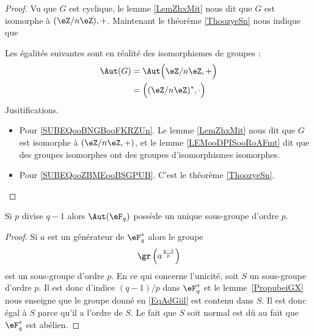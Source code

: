 \begin{proof}
	Vu que \( G\) est cyclique, le lemme \ref{LemZhxMit} nous dit que \( G\) est isomorphe à \( (\eZ/n\eZ),+\). Maintenant le théorème \ref{ThoozyeSn} nous indique que

	Les égalités suivantes sont en réalité des isomorphismes de groupes :
	\begin{subequations}
		\begin{align}
			\Aut(G) & =\Aut\Big( \eZ/n\eZ,+ \Big)  \label{SUBEQooBNGBooFKRZUn}       \\
			        & =\Big( (\eZ/n\eZ)^*,\cdot \Big)    \label{SUBEQooZBMEooBSGPUB}
		\end{align}
	\end{subequations}
	Jusitifications.
	\begin{itemize}
		\item
		      Pour \eqref{SUBEQooBNGBooFKRZUn}. Le lemme \ref{LemZhxMit} nous dit que \( G\) est isomorphe à \( (\eZ/n\eZ, +)\), et le lemme \ref{LEMooDPISooRoAFmt} dit que des groupes isomorphes ont des groupes d'isomorphismes isomorphes.

		\item
		      Pour \eqref{SUBEQooZBMEooBSGPUB}. C'est le théorème \ref{ThoozyeSn}.
	\end{itemize}
\end{proof}

\begin{corollary}       \label{CorwgmoTK}
	Si \( p\) divise \( q-1\) alors \( \Aut(\eF_q)\) possède un unique sous-groupe d'ordre \( p\).
\end{corollary}

\begin{proof}
	Si \( a\) est un générateur de \( \eF_q^*\) alors le groupe
	\begin{equation}    \label{EqAdGiil}
		\gr\left( a^{\frac{ q-1 }{ p }} \right)
	\end{equation}
	est un sous-groupe d'ordre \( p\). En ce qui concerne l'unicité, soit \( S\) un sous-groupe d'ordre \( p\). Il est donc d'indice \( (q-1)/p\) dans \( \eF_q^*\) et le lemme~\ref{PropubeiGX} nous enseigne que le groupe donné en \eqref{EqAdGiil} est contenu dans \( S\). Il est donc égal à \( S\) parce qu'il a l'ordre de \( S\). Le fait que \( S\) soit normal est dû au fait que \( \eF_q^*\) est abélien.
\end{proof}


